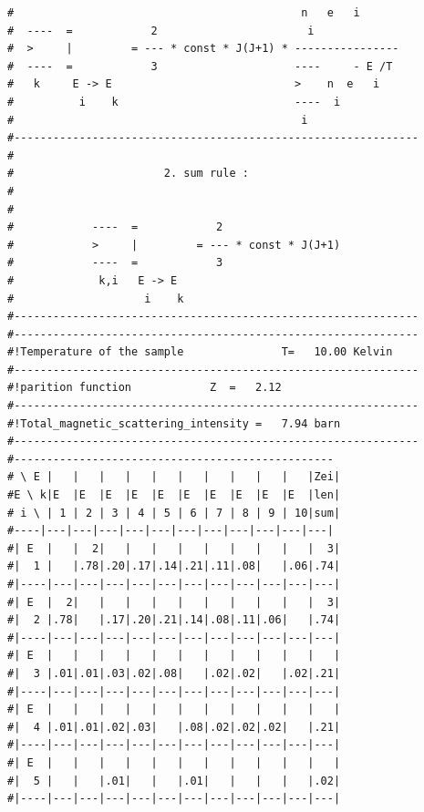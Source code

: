\begin{enumerate}
{\begin{verbatim}
#                                            n   e   i         
#  ----  =            2                       i                
#  >     |         = --- * const * J(J+1) * ----------------   
#  ----  =            3                     ----     - E /T    
#   k     E -> E                            >    n  e   i      
#          i    k                           ----  i            
#                                            i                 
#--------------------------------------------------------------
#                                                              
#                       2. sum rule :                          
#                                                              
#                                                              
#            ----  =            2                              
#            >     |         = --- * const * J(J+1)            
#            ----  =            3                              
#             k,i   E -> E                                     
#                    i    k                                    
#-------------------------------------------------------------- 
#-------------------------------------------------------------- 
#!Temperature of the sample               T=   10.00 Kelvin         
#-------------------------------------------------------------- 
#!parition function            Z  =   2.12                 
#-------------------------------------------------------------- 
#!Total_magnetic_scattering_intensity =   7.94 barn            
#-------------------------------------------------------------- 
#------------------------------------------------- 
# \ E |   |   |   |   |   |   |   |   |   |   |Zei|
#E \ k|E  |E  |E  |E  |E  |E  |E  |E  |E  |E  |len|
# i \ | 1 | 2 | 3 | 4 | 5 | 6 | 7 | 8 | 9 | 10|sum|
#----|---|---|---|---|---|---|---|---|---|---|---|
#| E  |   |  2|   |   |   |   |   |   |   |   |  3|
#|  1 |   |.78|.20|.17|.14|.21|.11|.08|   |.06|.74|
#|----|---|---|---|---|---|---|---|---|---|---|---|
#| E  |  2|   |   |   |   |   |   |   |   |   |  3|
#|  2 |.78|   |.17|.20|.21|.14|.08|.11|.06|   |.74|
#|----|---|---|---|---|---|---|---|---|---|---|---|
#| E  |   |   |   |   |   |   |   |   |   |   |   |
#|  3 |.01|.01|.03|.02|.08|   |.02|.02|   |.02|.21|
#|----|---|---|---|---|---|---|---|---|---|---|---|
#| E  |   |   |   |   |   |   |   |   |   |   |   |
#|  4 |.01|.01|.02|.03|   |.08|.02|.02|.02|   |.21|
#|----|---|---|---|---|---|---|---|---|---|---|---|
#| E  |   |   |   |   |   |   |   |   |   |   |   |
#|  5 |   |   |.01|   |   |.01|   |   |   |   |.02|
#|----|---|---|---|---|---|---|---|---|---|---|---|

\end{verbatim}}
\end{enumerate}
